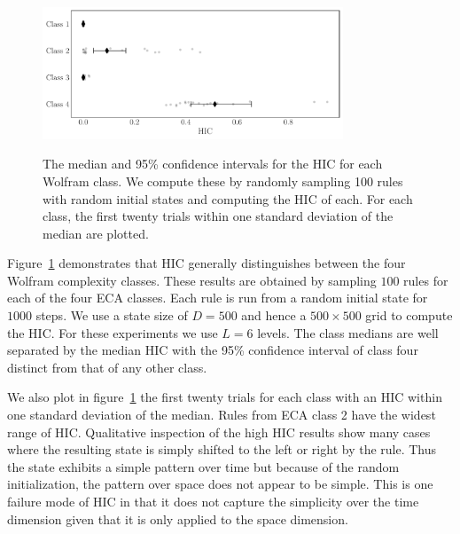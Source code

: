 \begin{figure}[t]
\centering
\includegraphics[width=0.8\textwidth]{figures/hic_by_class}
\label{fig:hic_by_class}
\caption{The median and 95\% confidence intervals for the HIC for each Wolfram
    class. We compute these by randomly sampling 100 rules with random initial
    states and computing the HIC of each. For each class, the first twenty
    trials within one standard deviation of the median are plotted.}
\label{fig:hic_by_class}
\end{figure}

Figure~\ref{fig:hic_by_class} demonstrates that HIC generally distinguishes
between the four Wolfram complexity classes. These results are obtained by
sampling $100$ rules for each of the four ECA classes. Each rule is run from a
random initial state for $1000$ steps. We use a state size of $D=500$ and hence
a $500 \times 500$ grid to compute the HIC. For these experiments we use $L=6$
levels. The class medians are well separated by the median HIC with the 95\%
confidence interval of class four distinct from that of any other class.

We also plot in figure~\ref{fig:hic_by_class} the first twenty trials for each
class with an HIC within one standard deviation of the median. Rules from ECA
class 2 have the widest range of HIC. Qualitative inspection of the high HIC
results show many cases where the resulting state is simply shifted to the left
or right by the rule. Thus the state exhibits a simple pattern over time but
because of the random initialization, the pattern over space does not appear to
be simple. This is one failure mode of HIC in that it does not capture the
simplicity over the time dimension given that it is only applied to the space
dimension.
